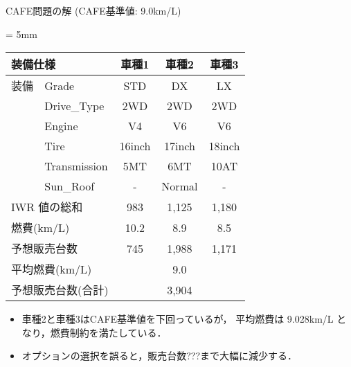 \documentclass[dvipdfmx, 11pt]{beamer}
\begin{document}
\begin{frame}{CAFE問題の解 {\normalsize (CAFE基準値: 9.0km/L)}}
 \begin{exampleblock}{}
  \centering
  \tabcolsep = 5mm
  \begin{tabular}{l|l|c|c|c} 
    \multicolumn{2}{l|}{装備仕様}  & 車種1 & 車種2 & 車種3 \\\hline
    装備 & \textsf{Grade}  & \textsf{STD}    & \textsf{DX}     & \textsf{LX}\\
    &\textsf{Drive\_Type}  & \textsf{2WD}    & \textsf{2WD}    & \textsf{2WD}\\
    &\textsf{Engine}	   & \textsf{V4}     & \textsf{V6}     & \textsf{V6}\\
    &\textsf{Tire}	   & \textsf{16inch} & \textsf{17inch} & \textsf{18inch}\\
    &\textsf{Transmission} & \textsf{5MT}    & \textsf{6MT}    & \textsf{10AT}\\
    &\textsf{Sun\_Roof}    & -               & \textsf{Normal} & -  \\ \hline
    \multicolumn{2}{l|}{IWR 値の総和} & 983  & 1,125   & 1,180 \\ %
    \multicolumn{2}{l|}{燃費(km/L)}      & 10.2  & 8.9     & 8.5 \\ %
    \multicolumn{2}{l|}{予想販売台数}    & 745   & 1,988   & 1,171  \\ \hline
    \multicolumn{2}{l|}{平均燃費(km/L)}  & \multicolumn{3}{c}{9.0} \\ 
    \multicolumn{2}{l|}{予想販売台数(合計)}  & \multicolumn{3}{c}{3,904} \\ 
  \end{tabular}
 \end{exampleblock}
 \vfill
 \begin{itemize}
 \item 車種2と車種3はCAFE基準値を下回っているが，
   平均燃費は 9.028km/L となり，燃費制約を満たしている．
 \item オプションの選択を誤ると，販売台数\alert{???}まで大幅に減少する．
 \end{itemize}
\end{frame}
\end{document}
